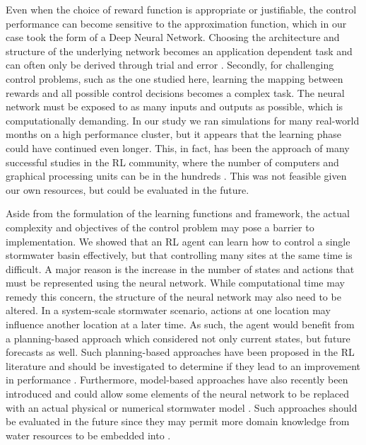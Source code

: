 Even when the choice of reward function is appropriate or justifiable, the control performance can become sensitive to the approximation function, which in our case took the form of a Deep Neural Network.
Choosing the architecture and structure of the underlying network becomes an application dependent task and can often only be derived through trial and error \cite{Sutton98, henderson2017Deep}.
Secondly, for challenging control problems, such as the one studied here, learning the mapping between rewards and all possible control decisions becomes a complex task.
The neural network must be exposed to as many inputs and outputs as possible, which is computationally demanding.
In our study we ran simulations for many real-world months on a high performance cluster, but it appears that the learning phase could have continued even longer.
This, in fact, has been the approach of many successful studies in the RL community, where the number of computers and graphical processing units can be in the hundreds \cite{espeholt2018impala, OpenAI_dota}.
This was not feasible given our own resources, but could be evaluated in the future.

Aside from the formulation of the learning functions and framework, the actual complexity and objectives of the control problem may pose a barrier to implementation.
We showed that an RL agent can learn how to control a single stormwater basin effectively, but that controlling many sites at the same time is difficult.
A major reason is the increase in the number of states and actions that must be represented using the neural network.
While computational time may remedy this concern, the structure of the neural network may also need to be altered.
In a system-scale stormwater scenario, actions at one location may influence another location at a later time.
As such, the agent would benefit from a planning-based approach which considered not only current states, but future forecasts as well.
Such planning-based approaches have been proposed in the RL literature and should be investigated to determine if they lead to an improvement in performance \cite{clavera2018model,depeweg2016learning}.
Furthermore, model-based approaches have also recently been introduced and could allow some elements of the neural network to be replaced with an actual physical or numerical stormwater model \cite{gu2016continuous}.
Such approaches should be evaluated in the future since they may permit more domain knowledge from water resources to be embedded into  .


